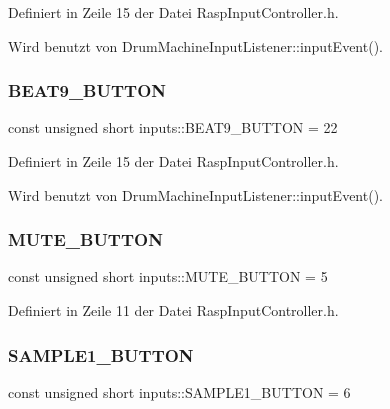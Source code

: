Definiert in Zeile 15 der Datei Rasp\+Input\+Controller.\+h.



Wird benutzt von Drum\+Machine\+Input\+Listener\+::input\+Event().

\mbox{\label{namespaceinputs_af628ea84bf7114a62249d4bb425ed06a}} 
\subsubsection{\texorpdfstring{B\+E\+A\+T9\+\_\+\+B\+U\+T\+T\+ON}{BEAT9\_BUTTON}}
{\footnotesize\ttfamily const unsigned short inputs\+::\+B\+E\+A\+T9\+\_\+\+B\+U\+T\+T\+ON = 22}



Definiert in Zeile 15 der Datei Rasp\+Input\+Controller.\+h.



Wird benutzt von Drum\+Machine\+Input\+Listener\+::input\+Event().

\mbox{\label{namespaceinputs_af0075a72395787966efcec2403306b43}} 
\subsubsection{\texorpdfstring{M\+U\+T\+E\+\_\+\+B\+U\+T\+T\+ON}{MUTE\_BUTTON}}
{\footnotesize\ttfamily const unsigned short inputs\+::\+M\+U\+T\+E\+\_\+\+B\+U\+T\+T\+ON = 5}



Definiert in Zeile 11 der Datei Rasp\+Input\+Controller.\+h.

\mbox{\label{namespaceinputs_a39dbaf6935309e198c1a0bc6e3468c45}} 
\subsubsection{\texorpdfstring{S\+A\+M\+P\+L\+E1\+\_\+\+B\+U\+T\+T\+ON}{SAMPLE1\_BUTTON}}
{\footnotesize\ttfamily const unsigned short inputs\+::\+S\+A\+M\+P\+L\+E1\+\_\+\+B\+U\+T\+T\+ON = 6}



